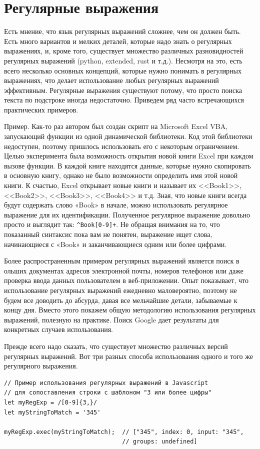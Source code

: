 \documentclass[a4paper,12pt,final,openany]{extbook}
\begin{document}
\hypertarget{Regular-Expressions}{%
\section{\texorpdfstring{\protect\hyperlink{Regular-Expressions}{}Регулярные
выражения}{Регулярные выражения}}\label{Regular-Expressions}}

Есть мнение, что язык регулярных выражений сложнее, чем он должен быть.
Есть много вариантов и мелких деталей, которые надо знать о регулярных выражениях, и, кроме того, существует множество различных разновидностей
регулярных выражений (python, extended, rust и т.д.). Несмотря на это,
есть всего несколько основных концепций, которые нужно понимать в регулярных выражениях, что делает использование любых регулярных
выражений эффективным.
Регулярные выражения существуют потому, что просто поиска текста по
подстроке иногда недостаточно. Приведем ряд часто встречающихся
практических примеров.

Пример. Как-то раз автором был создан скрипт на Microsoft Excel VBA, запускающий функции из
одной динамической библиотеки. Код этой библиотеки недоступен, поэтому
пришлось использовать его с некоторым ограничением. Целью эксперимента
была возможность открытия новой книги Excel при каждом вызове функции. В
каждой книге находятся данные, которые нужно скопировать в основную
книгу, однако не было возможности определить имя этой новой книги. К
счастью, Excel открывает новые книги и называет их <<Book1>>, <<Book2>>,
<<Book3>>, <<Book4>> и т.д. Зная, что новые книги всегда будут содержать
слово «Book» в начале, можно использовать регулярное выражение для их
идентификации. Полученное регулярное выражение довольно просто и
выглядит так: \verb|^Book[0-9]+|. Не обращая внимания на то,
что показанный синтаксис пока вам не понятен, выражение ищет слова,
начинающиеся с «Book» и заканчивающиеся одним или более цифрами.

Более распространенным примером регулярных выражений является поиск в ольших документах адресов электронной почты, номеров телефонов или
даже проверка ввода данных пользователем в веб-приложении. Опыт показывает, что
использование регулярных выражений ежедневно маловероятно, поэтому не будем
все доводить до абсурда, давая все мельчайшие детали, забываемые к концу дня. Вместо этого
покажем общую методологию использования регулярных выражений, полезную
на практике. Поиск Google дает результаты для конкретных случаев
использования.

Прежде всего надо сказать, что существует множество различных версий
регулярных выражений. Вот три разных способа использования одного и того
же регулярного выражения.
\begin{verbatim}
// Пример использования регулярных выражений в Javascript
// для сопоставления строки с шаблоном "3 или более цифры"
let myRegExp = /[0-9]{3,}/
let myStringToMatch = '345'

myRegExp.exec(myStringToMatch);  // ["345", index: 0, input: "345",
                                 // groups: undefined]
\end{verbatim}
\end{document}
